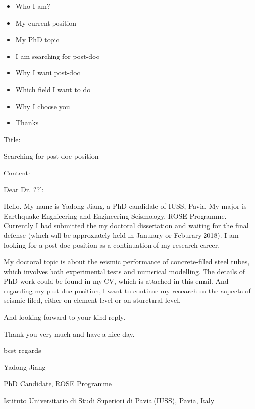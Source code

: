 \documentclass[a4paper]{article}
\begin{document}
\begin{itemize}
	\item Who I am?
	\item My current position
	\item My PhD topic
	\item I am searching for post-doc
	\item Why I want post-doc
	\item Which field I want to do
	\item Why I choose you
	\item Thanks
\end{itemize}




Title:

Searching for post-doc position

Content:

Dear Dr. ??':

Hello. My name is Yadong Jiang, a PhD candidate of IUSS, Pavia. My major is Earthquake Engnieering and Engineering Seismology, ROSE Programme. Currently I had submitted the my doctoral dissertation and waiting for the final defense (which will be approxiately held in Janurary or Feburary 2018).  I am looking for a post-doc position as a continuation of my research career.

My doctoral topic is about the seismic performance of concrete-filled steel tubes, which involves both experimental tests and numerical modelling. The details of PhD work could be found in my CV, which is attached in this email. And regarding my post-doc position, I want to continue my research on the aspects of seismic filed, either on element level or on sturctural level.

And looking forward to your kind reply.

Thank you very much and have a nice day.

best regards

Yadong Jiang

PhD Candidate, ROSE Programme

Istituto Universitario di Studi Superiori di Pavia (IUSS), Pavia, Italy
\end{document}

